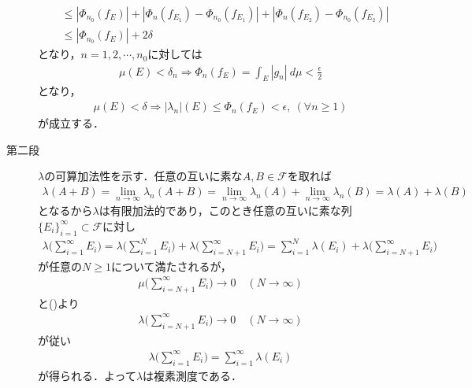 \begin{prf}
\begin{description}
\begin{align}
					&\leq \left|\Phi_{n_0}(f_E)\right| + \left|\Phi_n(f_{E_1}) - \Phi_{n_0}(f_{E_1})\right|
						+ \left|\Phi_n(f_{E_2}) - \Phi_{n_0}(f_{E_2})\right| \\
					&\leq \left|\Phi_{n_0}(f_E)\right| + 2\delta
				\end{align}
				となり，$n=1,2,\cdots,n_0$に対しては
				\begin{align}
					\mu(E) < \delta_n \Longrightarrow \Phi_n(f_E) = \int_E |g_n|\ d\mu < \frac{\epsilon}{2}
				\end{align}
				となり，
				\begin{align}
					\mu(E) < \delta \Longrightarrow |\lambda_n|(E) \leq \Phi_n(f_E) < \epsilon,\ (\forall n \geq 1)
				\end{align}
				が成立する．
				
			\item[第二段] $\lambda$の可算加法性を示す．任意の互いに素な$A,B \in \mathscr{F}$を取れば
				\begin{align}
					\lambda(A + B) = \lim_{n \to \infty} \lambda_n(A + B)
					= \lim_{n \to \infty} \lambda_n(A) + \lim_{n \to \infty} \lambda_n(B)
					= \lambda(A) + \lambda(B)
				\end{align}
				となるから$\lambda$は有限加法的であり，このとき任意の互いに素な列$\{E_i\}_{i=1}^\infty \subset \mathscr{F}$に対し
				\begin{align}
					\lambda\Biggl( \sum_{i=1}^\infty E_i \Biggr)
					= \lambda\Biggl( \sum_{i=1}^N E_i \Biggr) + \lambda\Biggl( \sum_{i=N+1}^\infty E_i \Biggr)
					= \sum_{i=1}^N \lambda(E_i) + \lambda\Biggl( \sum_{i=N+1}^\infty E_i \Biggr)
				\end{align}
				が任意の$N \geq 1$について満たされるが，
				\begin{align}
					\mu\Biggl( \sum_{i=N+1}^\infty E_i \Biggr) \longrightarrow 0 \quad (N \longrightarrow \infty)
				\end{align}
				と()より
				\begin{align}
					\lambda\Biggl( \sum_{i=N+1}^\infty E_i \Biggr) \longrightarrow 0 \quad (N \longrightarrow \infty)
				\end{align}
				が従い
				\begin{align}
					\lambda\Biggl( \sum_{i=1}^\infty E_i \Biggr) = \sum_{i=1}^\infty \lambda(E_i)
				\end{align}
				が得られる．よって$\lambda$は複素測度である．
				\QED
		\end{description}
	\end{prf}
	
